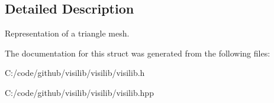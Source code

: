 \subsection{Detailed Description}
Representation of a triangle mesh. 

The documentation for this struct was generated from the following files\+:\begin{DoxyCompactItemize}
\item 
C\+:/code/github/visilib/visilib/visilib.\+h\item 
C\+:/code/github/visilib/visilib/visilib.\+hpp\end{DoxyCompactItemize}
